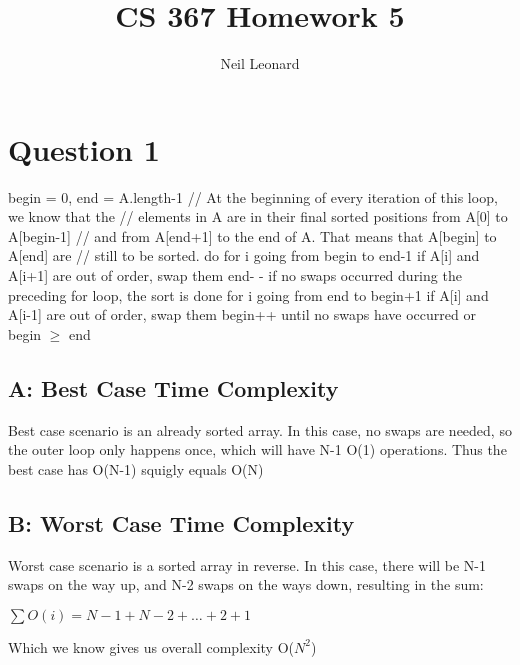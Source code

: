 \documentclass{article}
\title{CS 367 Homework 5}
\author{Neil Leonard}
\newcommand\tab[1][0.8cm]{\hspace*{#1}}
\begin{document}
\maketitle
\section{Question 1}
begin = 0, end = A.length-1
\newline
\color{OliveGreen}
// At the beginning of every iteration of this loop, we know that the \newline
// elements in A are in their final sorted positions from A[0] to A[begin-1] \newline
// and from A[end+1] to the end of A.  That means that A[begin] to A[end] are \newline
// still to be sorted. \newline
\color{blue}
do \newline
\tab   for \color{black} i going from begin to end-1 \newline
 \tab \tab    \color{blue}   if \color{black} A[i] and A[i+1] are out of order, swap them \newline
 \tab   end- - \newline
\color{blue}
 \tab   if \color{black} no swaps occurred during the preceding \color{blue} for \color{black} loop, the sort is done \newline
\color{blue}
\tab    for \color{black} i going from end to begin+1 \newline \color{blue}
\tab \tab        if \color{black} A[i] and A[i-1]  are out of order, swap them \newline
\tab    begin++ \newline
 until no swaps have occurred or begin $\geq$ end \newline
\subsection{A: Best Case Time Complexity}
	Best case scenario is an already sorted array. In this case, no swaps are needed, so the outer loop only happens once, which will have N-1 O(1) operations. Thus the best case has O(N-1) {squigly equals} O(N)
\subsection{B: Worst Case Time Complexity}
	Worst case scenario is a sorted array in reverse. In this case, there will be N-1 swaps on the way up, and N-2 swaps on the ways down, resulting in the sum: 
\begin{center}
$\sum O(i) = N-1 + N-2 + \dots + 2 + 1 $
\end{center}
Which we know gives us overall complexity O($N^2$)
\newpage
\end{document}
